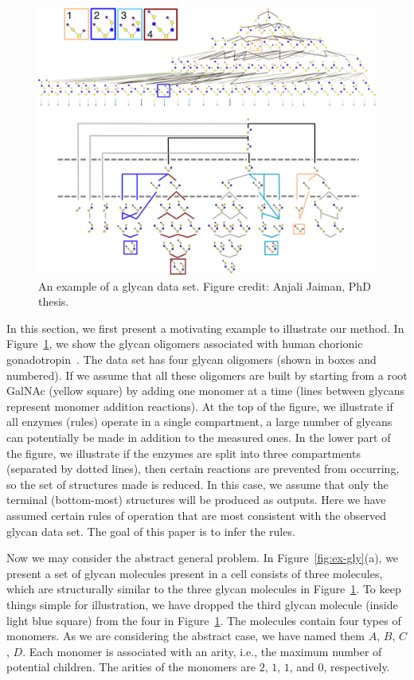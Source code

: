 \begin{figure}[t]
\centering
\includegraphics[width=0.8\linewidth]{gfig2.png}
\caption{An example of a glycan data set. Figure credit: Anjali Jaiman, PhD thesis.}
\label{fig:dataset-gly}
\end{figure}



In this section, we first present a motivating example to illustrate our method.
In Figure~\ref{fig:dataset-gly}, we show the glycan oligomers associated with human chorionic
gonadotropin~\cite{Harrd1992}.
The data set has four glycan oligomers (shown in boxes and numbered). If we assume that all these oligomers
are built by starting from a root GalNAc (yellow square) by adding one monomer at a
time (lines between glycans represent monomer addition reactions). At the top of the figure, we illustrate
if all enzymes (rules) operate in a
single compartment, a large number of glycans can potentially be made in addition to the measured ones.
In the lower part of the figure, we illustrate if the enzymes are split into three compartments
(separated by dotted lines), then certain reactions are prevented from occurring, so the set of structures
made is reduced.
In this case, we assume that only the terminal (bottom-most) structures will be produced as outputs.
Here we have assumed certain rules of operation that are most consistent with the observed glycan data set.
The goal of this paper is to infer the rules.


Now we may consider the abstract general problem. In Figure~\ref{fig:ex-gly}(a), we present a set of
glycan molecules present in a cell consists of three molecules, which are structurally similar to the
three glycan molecules in Figure~\ref{fig:dataset-gly}.
To keep things simple for illustration, we have dropped the third glycan molecule
(inside light blue square) from the four in
Figure~\ref{fig:dataset-gly}.
%
The molecules contain four types of monomers.
As we are considering the abstract case, we have named them $A$, $B$, $C$, $D$.
Each monomer is associated with an arity, i.e., the maximum number of potential children.
The arities of the monomers are $2$, $1$, $1$, and $0$, respectively.

